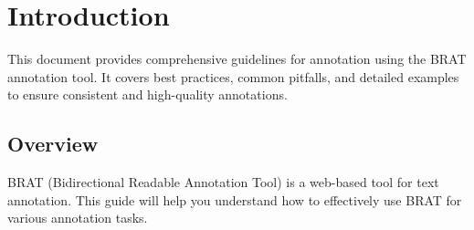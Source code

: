 
\section{Introduction}

This document provides comprehensive guidelines for annotation using the BRAT annotation tool. It covers best practices, common pitfalls, and detailed examples to ensure consistent and high-quality annotations.

\subsection{Overview}

BRAT (Bidirectional Readable Annotation Tool) is a web-based tool for text annotation. This guide will help you understand how to effectively use BRAT for various annotation tasks.

